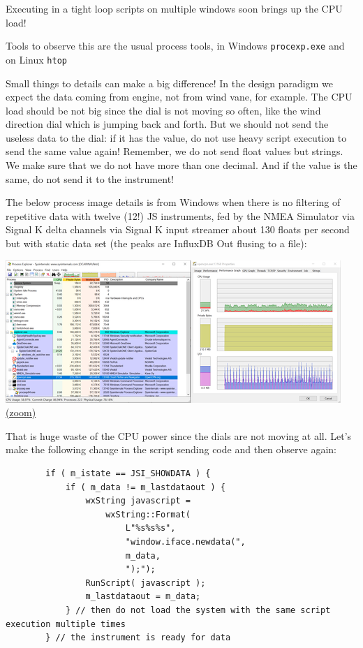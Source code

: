 \documentclass[11pt]{article}
\begin{document}
    Executing in a tight loop scripts on multiple windows soon brings up the
CPU load!

    Tools to observe this are the usual process tools, in Windows
\texttt{procexp.exe} and on Linux \texttt{htop}

    Small things to details can make a big difference! In the design
paradigm we expect the data coming from engine, not from wind vane, for
example. The CPU load should be not big since the dial is not moving so
often, like the wind direction dial which is jumping back and forth. But
we should not send the useless data to the dial: if it has the value, do
not use heavy script execution to send the same value again! Remember,
we do not send float values but strings. We make sure that we do not
have more than one decimal. And if the value is the same, do not send it
to the instrument!

    The below process image details is from Windows when there is no
filtering of repetitive data with twelve (12!) JS instruments, fed by
the NMEA Simulator via Signal K delta channels via Signal K input
streamer about 130 floats per second but with static data set (the peaks
are InfluxDB Out flusing to a file):

    \includegraphics{2020-01-20_dgb_procexp_12_instrucjs_clients_alpha_01.png}
\href{img/2020-01-20_dgb_procexp_12_instrucjs_clients_alpha_01.png}{(zoom)}

    That is huge waste of the CPU power since the dials are not moving at
all. Let's make the following change in the script sending code and then
observe again:

\begin{verbatim}
        if ( m_istate == JSI_SHOWDATA ) {
            if ( m_data != m_lastdataout ) {
                wxString javascript =
                    wxString::Format(
                        L"%s%s%s",
                        "window.iface.newdata(",
                        m_data,
                        ");");
                RunScript( javascript );
                m_lastdataout = m_data;
            } // then do not load the system with the same script execution multiple times
        } // the instrument is ready for data
\end{verbatim}
\end{document}
